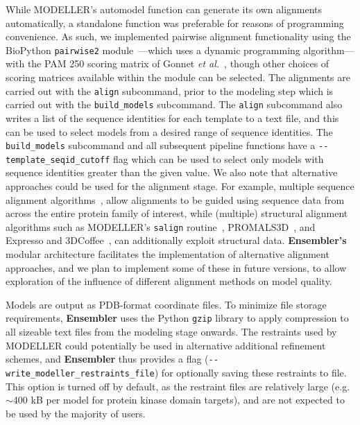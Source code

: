 \documentclass[aps,pre,twocolumn,nofootinbib,superscriptaddress,linenumbers]{revtex4-1}
\begin{document}
While MODELLER's automodel function can generate its own alignments automatically, a standalone function was preferable for reasons of programming convenience.
\color{red}
As such, we implemented pairwise alignment functionality using the BioPython {\tt pairwise2} module~\cite{cock:2009:biopython}---which uses a dynamic programming algorithm---with the PAM 250 scoring matrix of Gonnet \textit{et al.}~\cite{gonnet:science:1992:exhaustive-matching}, though other choices of scoring matrices available within the module can be selected.
\color{black}
The alignments are carried out with the {\tt align} subcommand, prior to the modeling step which is carried out with the {\tt build\_models} subcommand.
The {\tt align} subcommand also writes a list of the sequence identities for each template to a text file, and this can be used to select models from a desired range of sequence identities.
The {\tt build\_models} subcommand and all subsequent pipeline functions have a {\tt -{}-template\_seqid\_cutoff} flag which can be used to select only models with sequence identities greater than the given value.
We also note that alternative approaches could be used for the alignment stage.
For example, multiple sequence alignment algorithms~\cite{thompson:2011:msa-review}, allow alignments to be guided using sequence data from across the entire protein family of interest, while (multiple) structural alignment algorithms such as MODELLER's {\tt salign} routine~\cite{fiser:prot-sci:2000:modeller,sali:jmb:1993:modeller}, PROMALS3D~\cite{pei:2008:promals3d}, and Expresso and 3DCoffee~\cite{expresso,3dcoffee}, can additionally exploit structural data.
{\bf Ensembler's} modular architecture facilitates the implementation of alternative alignment approaches, and we plan to implement some of these in future versions, to allow exploration of the influence of different alignment methods on model quality.

Models are output as PDB-format coordinate files.
To minimize file storage requirements, {\bf Ensembler} uses the Python {\tt gzip} library to apply compression to all sizeable text files from the modeling stage onwards.
The restraints used by MODELLER could potentially be used in alternative additional refinement schemes, and {\bf Ensembler} thus provides a flag ({\tt -{}-write\_modeller\_restraints\_file}) for optionally saving these restraints to file.
This option is turned off by default, as the restraint files are relatively large (e.g.~$\sim$400 kB per model for protein kinase domain targets), and are not expected to be used by the majority of users.
\end{document}
